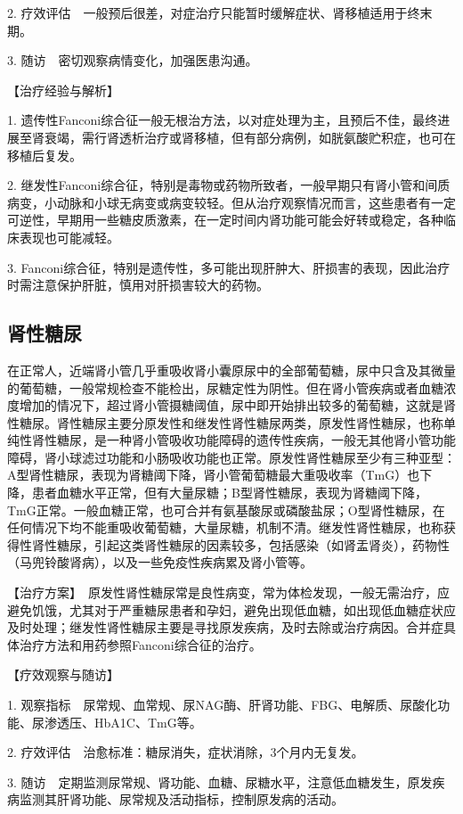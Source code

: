 2.
疗效评估　一般预后很差，对症治疗只能暂时缓解症状、肾移植适用于终末期。

3. 随访　密切观察病情变化，加强医患沟通。

【治疗经验与解析】

1.
遗传性Fanconi综合征一般无根治方法，以对症处理为主，且预后不佳，最终进展至肾衰竭，需行肾透析治疗或肾移植，但有部分病例，如胱氨酸贮积症，也可在移植后复发。

2.
继发性Fanconi综合征，特别是毒物或药物所致者，一般早期只有肾小管和间质病变，小动脉和小球无病变或病变较轻。但从治疗观察情况而言，这些患者有一定可逆性，早期用一些糖皮质激素，在一定时间内肾功能可能会好转或稳定，各种临床表现也可能减轻。

3.
Fanconi综合征，特别是遗传性，多可能出现肝肿大、肝损害的表现，因此治疗时需注意保护肝脏，慎用对肝损害较大的药物。

\subsection{肾性糖尿}

在正常人，近端肾小管几乎重吸收肾小囊原尿中的全部葡萄糖，尿中只含及其微量的葡萄糖，一般常规检查不能检出，尿糖定性为阴性。但在肾小管疾病或者血糖浓度增加的情况下，超过肾小管摄糖阈值，尿中即开始排出较多的葡萄糖，这就是肾性糖尿。肾性糖尿主要分原发性和继发性肾性糖尿两类，原发性肾性糖尿，也称单纯性肾性糖尿，是一种肾小管吸收功能障碍的遗传性疾病，一般无其他肾小管功能障碍，肾小球滤过功能和小肠吸收功能也正常。原发性肾性糖尿至少有三种亚型：A型肾性糖尿，表现为肾糖阈下降，肾小管葡萄糖最大重吸收率（TmG）也下降，患者血糖水平正常，但有大量尿糖；B型肾性糖尿，表现为肾糖阈下降，TmG正常。一般血糖正常，也可合并有氨基酸尿或磷酸盐尿；O型肾性糖尿，在任何情况下均不能重吸收葡萄糖，大量尿糖，机制不清。继发性肾性糖尿，也称获得性肾性糖尿，引起这类肾性糖尿的因素较多，包括感染（如肾盂肾炎），药物性（马兜铃酸肾病），以及一些免疫性疾病累及肾小管等。

【治疗方案】　原发性肾性糖尿常是良性病变，常为体检发现，一般无需治疗，应避免饥饿，尤其对于严重糖尿患者和孕妇，避免出现低血糖，如出现低血糖症状应及时处理；继发性肾性糖尿主要是寻找原发疾病，及时去除或治疗病因。合并症具体治疗方法和用药参照Fanconi综合征的治疗。

【疗效观察与随访】

1.
观察指标　尿常规、血常规、尿NAG酶、肝肾功能、FBG、电解质、尿酸化功能、尿渗透压、HbA1C、TmG等。

2. 疗效评估　治愈标准：糖尿消失，症状消除，3个月内无复发。

3.
随访　定期监测尿常规、肾功能、血糖、尿糖水平，注意低血糖发生，原发疾病监测其肝肾功能、尿常规及活动指标，控制原发病的活动。

